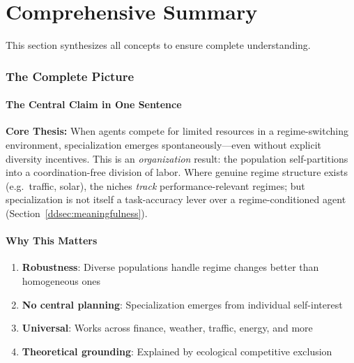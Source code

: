 \documentclass[11pt,a4paper]{article}
\theoremstyle{definition}
\theoremstyle{plain}
\begin{document}
\newpage
\part{Comprehensive Summary}

This section synthesizes all concepts to ensure complete understanding.

\section{The Complete Picture}

\subsection{The Central Claim in One Sentence}

\begin{keypoint}
\textbf{Core Thesis:} When agents compete for limited resources in a regime-switching environment, specialization emerges spontaneously---even without explicit diversity incentives. This is an \emph{organization} result: the population self-partitions into a coordination-free division of labor. Where genuine regime structure exists (e.g.\ traffic, solar), the niches \emph{track} performance-relevant regimes; but specialization is not itself a task-accuracy lever over a regime-conditioned agent (Section~\ref{ddsec:meaningfulness}).
\end{keypoint}

\subsection{Why This Matters}

\begin{enumerate}
    \item \textbf{Robustness}: Diverse populations handle regime changes better than homogeneous ones
    \item \textbf{No central planning}: Specialization emerges from individual self-interest
    \item \textbf{Universal}: Works across finance, weather, traffic, energy, and more
    \item \textbf{Theoretical grounding}: Explained by ecological competitive exclusion
\end{enumerate}
\end{document}
